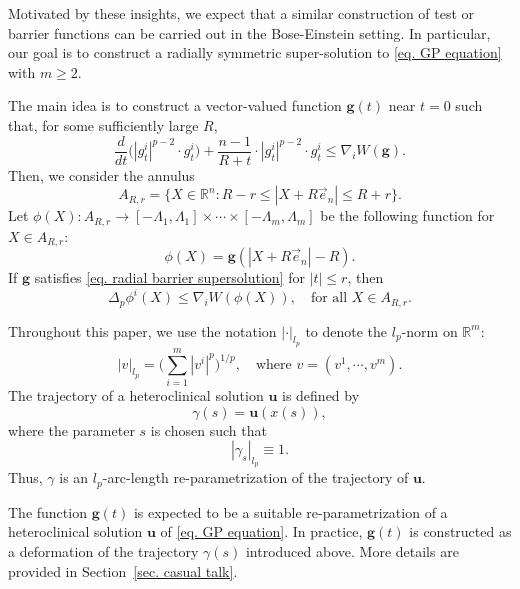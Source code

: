 \documentclass[11pt,twoside,reqno]{amsart}
\numberwithin{equation}{section}
\begin{document}
Motivated by these insights, we expect that a similar construction of test or barrier functions can be carried out in the Bose-Einstein setting. In particular, our goal is to construct a radially symmetric super-solution to \eqref{eq. GP equation} with $m\geq2$.

The main idea is to construct a vector-valued function $\mathbf{g}(t)$ near $t=0$ such that, for some sufficiently large $R$,
\begin{equation}\label{eq. radial barrier supersolution}
    \frac{d}{dt}\Big(|g^{i}_{t}|^{p-2}\cdot g^{i}_{t}\Big)+\frac{n-1}{R+t}\cdot|g^{i}_{t}|^{p-2}\cdot g^{i}_{t}\leq \nabla_{i}W(\mathbf{g}).
\end{equation}
Then, we consider the annulus
\begin{equation*}
    A_{R,r}=\{X\in\mathbb{R}^{n}:R-r\leq|X+R\vec{e}_{n}|\leq R+r\}.
\end{equation*}
Let $\phi(X):A_{R,r}\to[-\Lambda_{1},\Lambda_{1}]\times\cdots\times[-\Lambda_{m},\Lambda_{m}]$ be the following function for $X\in A_{R,r}$:
\begin{equation}\label{eq. rotate the barrier function}
    \phi(X)=\mathbf{g}(|X+R\vec{e}_{n}|-R).
\end{equation}
If $\mathbf{g}$ satisfies \eqref{eq. radial barrier supersolution} for $|t|\leq r$, then
\begin{equation*}
    \Delta_{p}\phi^{i}(X)\leq\nabla_{i}W(\phi(X)),\quad\mbox{for all }X\in A_{R,r}.
\end{equation*}

Throughout this paper, we use the notation $|\cdot|_{l_p}$ to denote the $l_p$-norm on $\mathbb{R}^m$:
\begin{equation*}
    |v|_{l_{p}}=\Big(\sum_{i=1}^{m}|v^{i}|^{p}\Big)^{1/p},\quad\mbox{where }v=(v^{1},\cdots,v^{m}).
\end{equation*}
The trajectory of a heteroclinical solution $\mathbf{u}$ is defined by
\[
\gamma(s)=\mathbf{u}(x(s)),
\]
where the parameter $s$ is chosen such that
\[
|\gamma_s|_{l_p}\equiv1.
\]
Thus, $\gamma$ is an $l_p$-arc-length re-parametrization of the trajectory of $\mathbf{u}$.

The function $\mathbf{g}(t)$ is expected to be a suitable re-parametrization of a heteroclinical solution $\mathbf{u}$ of \eqref{eq. GP equation}. In practice, $\mathbf{g}(t)$ is constructed as a deformation of the trajectory $\gamma(s)$ introduced above. More details are provided in Section~\ref{sec. casual talk}. 
\end{document}
